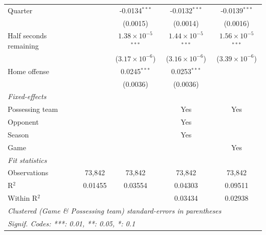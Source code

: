 \begin{table}[htbp]
\begin{tabular}{lcccc}
      Quarter                                 &                & -0.0134$^{***}$               & -0.0132$^{***}$               & -0.0139$^{***}$\\   
                                              &                & (0.0015)                      & (0.0014)                      & (0.0016)\\   
      Half seconds remaining                  &                & $1.38\times 10^{-5}$$^{***}$  & $1.44\times 10^{-5}$$^{***}$  & $1.56\times 10^{-5}$$^{***}$\\    
                                              &                & ($3.17\times 10^{-6}$)        & ($3.16\times 10^{-6}$)        & ($3.39\times 10^{-6}$)\\    
      Home offense                            &                & 0.0245$^{***}$                & 0.0253$^{***}$                &   \\   
                                              &                & (0.0036)                      & (0.0036)                      &   \\   
      \midrule
      \emph{Fixed-effects}\\
      Possessing team                         &                &                               & Yes                           & Yes\\  
      Opponent                                &                &                               & Yes                           & \\  
      Season                                  &                &                               & Yes                           & \\  
      Game                                    &                &                               &                               & Yes\\  
      \midrule
      \emph{Fit statistics}\\
      Observations                            & 73,842         & 73,842                        & 73,842                        & 73,842\\  
      R$^2$                                   & 0.01455        & 0.03554                       & 0.04303                       & 0.09511\\  
      Within R$^2$                            &                &                               & 0.03434                       & 0.02938\\  
      \midrule \midrule
      \multicolumn{5}{l}{\emph{Clustered (Game \& Possessing team) standard-errors in parentheses}}\\
      \multicolumn{5}{l}{\emph{Signif. Codes: ***: 0.01, **: 0.05, *: 0.1}}\\
   \end{tabular}
\end{table}


